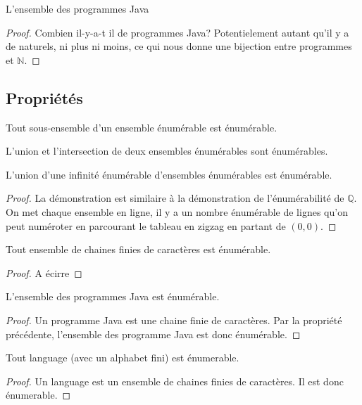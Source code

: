 \begin{myexem}
  L'ensemble des programmes Java
  \begin{proof}
  Combien il-y-a-t il de programmes Java? Potentielement autant qu'il y a de naturels, ni plus ni moins, ce qui nous donne une bijection entre programmes et $\mathbb{N}$. 
  \end{proof}
\end{myexem}


\subsection{Propriétés}
\label{subsec:proprietes}

\begin{myprop}
	Tout sous-ensemble d'un ensemble énumérable est énumérable.
\end{myprop}

\begin{myprop}
	L'union et l'intersection de deux ensembles énumérables sont énumérables.
\end{myprop}

\begin{myprop}
	L'union d'une infinité énumérable d'ensembles énumérables est énumérable.
    \begin{proof}
      La démonstration est similaire à la démonstration de l'énumérabilité de $\mathbb{Q}$.
      On met chaque ensemble en ligne, il y a un nombre énumérable de lignes qu'on peut numéroter en parcourant le tableau en zigzag
      en partant de $(0,0)$.
    \end{proof}
\end{myprop}

\begin{myprop}
 Tout ensemble  de chaines finies de caractères est énumérable.
 \begin{proof}
A écirre
 \end{proof}
\end{myprop}

\begin{myprop}
 L'ensemble des programmes Java est énumérable.
 \begin{proof}
  Un programme Java est une chaine finie de caractères.  Par la propriété précédente, l'ensemble des programme Java est  donc énumérable.
 \end{proof}
\end{myprop}


\begin{myprop}
 Tout language (avec un alphabet fini) est énumerable. 
 \begin{proof}
 Un language est un ensemble de chaines finies de caractères.  Il est donc  énumerable.
 \end{proof}
\end{myprop}


